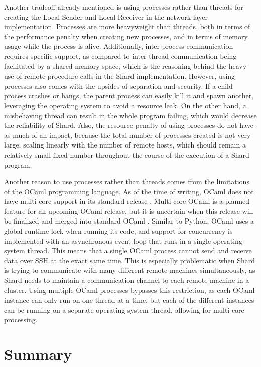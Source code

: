 \documentclass[twoside]{report}
\begin{document}
Another tradeoff already mentioned is using processes rather than threads for creating the Local Sender and Local Receiver in the network layer implementation.
Processes are more heavyweight than threads, both in terms of the performance penalty when creating new processes, and in terms of memory usage while the process is alive.
Additionally, inter-process communication requires specific support, as compared to inter-thread communication being facilitated by a shared memory space, which is the reasoning behind the heavy use of remote procedure calls in the Shard implementation.
However, using processes also comes with the upsides of separation and security.
If a child process crashes or hangs, the parent process can easily kill it and spawn another, leveraging the operating system to avoid a resource leak.
On the other hand, a misbehaving thread can result in the whole program failing, which would decrease the reliability of Shard.
Also, the resource penalty of using processes do not have as much of an impact, because the total number of processes created is not very large, scaling linearly with the number of remote hosts, which should remain a relatively small fixed number throughout the course of the execution of a Shard program.

Another reason to use processes rather than threads comes from the limitations of the OCaml programming language.
As of the time of writing, OCaml does not have multi-core support in its standard release
\cite{dolan2014multicore}.
Multi-core OCaml is a planned feature for an upcoming OCaml release, but it is uncertain when this release will be finalized and merged into standard OCaml \cite{sivaramakrishnan2020retrofitting}.
Similar to Python, OCaml uses a global runtime lock when running its code, and support for concurrency is implemented with an asynchronous event loop that runs in a single operating system thread.
This means that a single OCaml process cannot send and receive data over SSH at the exact same time.
This is especially problematic when Shard is trying to communicate with many different remote machines simultaneously, as Shard needs to maintain a communication channel to each remote machine in a cluster.
Using multiple OCaml processes bypasses this restriction, as each OCaml instance can only run on one thread at a time, but each of the different instances can be running on a separate operating system thread, allowing for multi-core processing.

\section{Summary}
\end{document}

